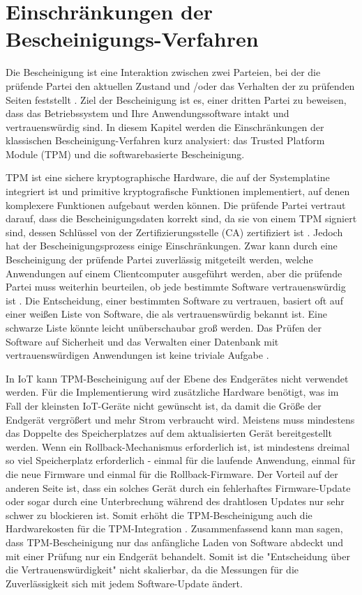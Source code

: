 \section{Einschränkungen der Bescheinigungs-Verfahren}
\label{sec:sicher:tpm}
Die Bescheinigung ist eine Interaktion zwischen zwei Parteien, bei der die prüfende Partei den aktuellen Zustand und /oder das Verhalten der zu prüfenden Seiten feststellt \cite[p.11]{website:Attestation}. Ziel der Bescheinigung ist es, einer dritten Partei zu beweisen, dass das Betriebssystem und Ihre Anwendungssoftware intakt und vertrauenswürdig sind. In diesem Kapitel werden die Einschränkungen der klassischen Bescheinigung-Verfahren kurz analysiert: das Trusted Platform Module (TPM) und die softwarebasierte Bescheinigung. 

TPM ist eine sichere kryptographische Hardware, die auf der Systemplatine integriert ist und primitive kryptografische Funktionen implementiert, auf denen komplexere Funktionen aufgebaut werden können. Die prüfende Partei vertraut darauf, dass die Bescheinigungsdaten korrekt sind, da sie von einem TPM signiert sind, dessen Schlüssel von der Zertifizierungsstelle (CA) zertifiziert ist \cite[p.4]{website:TPM}. Jedoch hat der Bescheinigungsprozess einige Einschränkungen. Zwar kann durch eine Bescheinigung der prüfende Partei zuverlässig mitgeteilt werden, welche Anwendungen auf einem Clientcomputer ausgeführt werden, aber die prüfende Partei muss weiterhin beurteilen, ob jede bestimmte Software vertrauenswürdig ist \cite[p.7]{website:TPM}. Die Entscheidung, einer bestimmten Software zu vertrauen, basiert oft auf einer weißen Liste von Software, die als vertrauenswürdig bekannt ist. Eine schwarze Liste könnte leicht unüberschaubar groß werden. Das Prüfen der Software auf Sicherheit und das Verwalten einer Datenbank mit vertrauenswürdigen Anwendungen ist keine triviale Aufgabe \cite[p.7]{website:TPM}.

In IoT kann TPM-Bescheinigung auf der Ebene des Endgerätes nicht verwendet werden. Für die Implementierung wird zusätzliche Hardware benötigt, was im Fall der kleinsten IoT-Geräte nicht gewünscht ist, da damit die Größe der Endgerät vergrößert und mehr Strom verbraucht wird. Meistens muss mindestens das Doppelte des Speicherplatzes auf dem aktualisierten Gerät  bereitgestellt werden. Wenn ein Rollback-Mechanismus erforderlich ist, ist mindestens dreimal so viel Speicherplatz erforderlich - einmal für die laufende Anwendung, einmal für die neue Firmware und einmal für die Rollback-Firmware. Der Vorteil auf der anderen Seite ist, dass ein solches Gerät durch ein fehlerhaftes Firmware-Update oder sogar durch eine Unterbrechung während des drahtlosen Updates nur sehr schwer zu blockieren ist. Somit erhöht die TPM-Bescheinigung auch die Hardwarekosten für die TPM-Integration \cite[p.17]{website:Attestation}. Zusammenfassend kann man sagen, dass TPM-Bescheinigung nur das anfängliche Laden von Software abdeckt und mit einer Prüfung nur ein Endgerät behandelt. Somit ist die "Entscheidung über die Vertrauenswürdigkeit" nicht skalierbar, da die Messungen für die Zuverlässigkeit sich mit jedem Software-Update ändert. 

